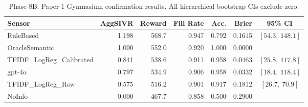 \begin{table}[t]
\centering
\caption{Phase-8B: Paper-1 Gymnasium confirmation results. All hierarchical bootstrap CIs exclude zero.}
\label{tab:phase8b}
\begin{tabular}{lrrrrrc}
\toprule
Sensor & AggSIVR & Reward & Fill Rate & Acc. & Brier & 95\% CI \\
\midrule
RuleBased & 1.198 & 568.7 & 0.947 & 0.792 & 0.1615 & $[54.3,\ 148.1]$ \\
OracleSemantic & 1.000 & 552.0 & 0.920 & 1.000 & 0.0000 &  \\
TFIDF_LogReg_Calibrated & 0.841 & 538.6 & 0.911 & 0.958 & 0.0463 & $[25.8,\ 117.8]$ \\
gpt-4o & 0.797 & 534.9 & 0.906 & 0.958 & 0.0332 & $[18.4,\ 118.4]$ \\
TFIDF_LogReg_Raw & 0.575 & 516.2 & 0.901 & 0.917 & 0.1812 & $[26.7,\ 70.9]$ \\
NoInfo & 0.000 & 467.7 & 0.858 & 0.500 & 0.2900 &  \\
\bottomrule
\end{tabular}
\end{table}
